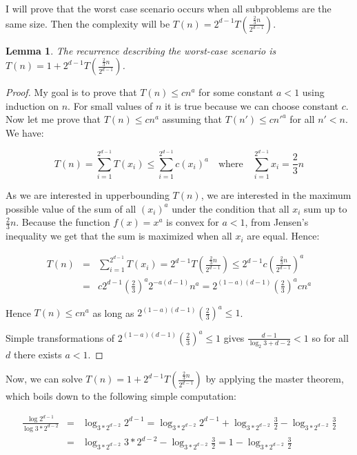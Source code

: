 \documentclass[10pt,a4paper]{article}
\newtheorem{lemma}{Lemma}
\begin{document}
I will prove that the worst case scenario occurs when all subproblems are the same size. Then the complexity will be $T(n)=2^{d-1}T(\frac{\frac{2}{3}n}{2^{d-1}})$.

\begin{lemma}\label{lem:5}
The recurrence describing the worst-case scenario is $T(n)=1+2^{d-1}T(\frac{\frac{2}{3}n}{2^{d-1}})$.
\end{lemma}

\begin{proof}

My goal is to prove that $T(n) \leq c n^a$ for some constant $a < 1$ using induction on $n$. For small values of $n$ it is true because we can choose constant $c$. Now let me prove that $T(n) \leq c n^a$ assuming that $T(n') \leq c n'^a$ for all $n'<n$. We have:

$$T(n) = \displaystyle\sum\limits_{i=1}^{2^{d-1}} T(x_i)\leq\displaystyle\sum\limits_{i=1}^{2^{d-1}} c(x_i)^{a}  \quad\text{where}\quad  \displaystyle\sum\limits_{i=1}^{2^{d-1}} x_i = \frac{2}{3}n$$ 

As we are interested in upperbounding $T(n)$, we are interested in the maximum possible value of the sum of all $(x_i)^{a}$ under the condition that all $x_{i}$ sum up to $\frac{2}{3}n$. Because the function $f(x)=x^{a}$ is convex for $a<1$, from Jensen's inequality we get that the sum is maximized when all $x_{i}$ are equal. Hence:

\begin{eqnarray*}
T(n) &=& \displaystyle\sum\limits_{i=1}^{2^{d-1}} T(x_i) = 2^{d-1} T\left(\frac{\frac{2}{3}n}{2^{d-1}}\right) \leq 2^{d-1} c \left(\frac{\frac{2}{3}n}{2^{d-1}}\right) ^ a  \\
& = & c 2^{d-1} \left(\frac{2}{3}\right)^a 2^{-a(d-1)} n^a = 2^{(1-a)(d-1)} \left(\frac{2}{3}\right)^a c n^a
\end{eqnarray*}

Hence $T(n)\leq c n^{a}$ as long as $2^{(1-a)(d-1)} (\frac{2}{3})^a \leq 1$.
\bigskip


Simple transformations of $2^{(1-a)(d-1)} (\frac{2}{3})^a \leq 1$ gives $\frac{d-1}{\log_2{3} + d - 2} < 1$ so for all $d$ there exists $a < 1$.

\end{proof}

Now, we can solve $T(n)=1+2^{d-1}T(\frac{\frac{2}{3}n}{2^{d-1}})$ by applying the master theorem, which boils down to the following simple computation:

\begin{eqnarray*}
\frac{\log 2^{d-1}}{\log 3*2^{d-2}} &=& \log_{3*2^{d-2}}{2^{d-1}} = \log_{3*2^{d-2}}{2^{d-1}} + \log_{3*2^{d-2}}{\frac{3}{2}} - \log_{3*2^{d-2}}{\frac{3}{2}}\\ 
&=& \log_{3*2^{d-2}}{3*2^{d-2}} - \log_{3*2^{d-2}}{\frac{3}{2}} = 1 - \log_{3*2^{d-2}}{\frac{3}{2}}
\end{eqnarray*}
\end{document}
